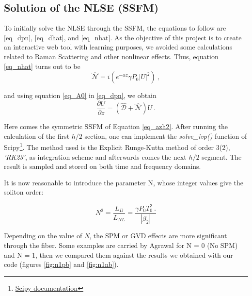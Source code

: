         \subsection{Solution of the NLSE (SSFM)}\label{subsec:nlse}
            To initially solve the NLSE through the SSFM, the equations to follow are \eqref{eq_dpn}, \eqref{eq_dhat}, and \eqref{eq_nhat}. As the objective of this project is to create an interactive web tool with learning purposes, we avoided some calculations related to Raman Scattering and other nonlinear effects. Thus, equation \eqref{eq_nhat} turns out to be 
            \begin{equation} \label{eq_nhat2}
             \hat{\mathcal{N}} = i \left( 
             e^{-\alpha z} \gamma P_0 \left|U\right|^2 
             \right) \ ,
        \end{equation}
        
        and using equation \eqref{eq_A0} in \eqref{eq_dpn}, we obtain
        \begin{equation}\label{eq_dpn2}
            \frac{\partial U}{\partial z} = \left( \hat{\mathcal{D}} + \hat{\mathcal{N}} \right) U \ . 
        \end{equation}
        
        Here comes the symmetric SSFM of Equation \eqref{eq_azh2}. After running the calculation of the first $h/2$ section, one can implement the \emph{solve\_ivp()} function of Scipy\footnote{\href{https://docs.scipy.org/doc/scipy/reference/generated/scipy.integrate.solve_ivp.html}{Scipy documentation}}. The method used is the Explicit Runge-Kutta method of order 3(2), \emph{'RK23'}, as integration scheme and afterwards comes the next $h/2$ segment. The result is sampled and stored on both time and frequency domains. 
        
        It is now reasonable to introduce the parameter N, whose integer values give the soliton order:
        
        \begin{equation}\label{eq_n}
            N^2 = \frac{L_D}{L_{NL}} = \frac{\gamma P_0 T^2_0 \ . }{\left|\beta_2\right|}
        \end{equation}
        
        
        Depending on the value of \emph{N}, the SPM or GVD effects are more significant through the fiber. Some examples are carried by Agrawal \citep{AgrawalBook} for N = 0 (No SPM) and N = 1, then we compared them against the results we obtained with our code (figures \ref{fig:n1pb} and \ref{fig:n1nb}). 
        
